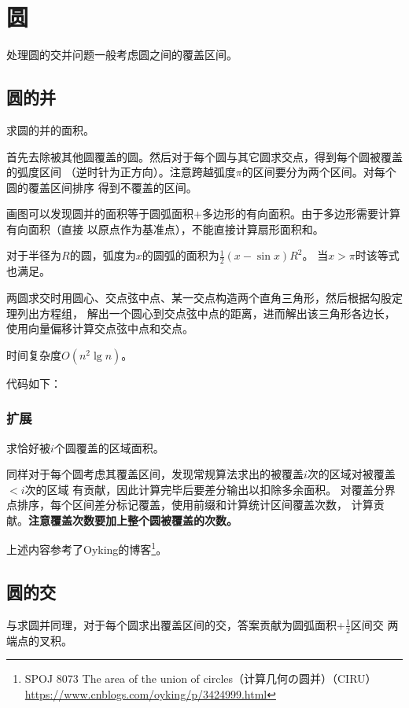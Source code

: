 \section{圆}
处理圆的交并问题一般考虑圆之间的覆盖区间。
\subsection{圆的并}
求圆的并的面积。

首先去除被其他圆覆盖的圆。然后对于每个圆与其它圆求交点，得到每个圆被覆盖的弧度区间
（逆时针为正方向）。注意跨越弧度$\pi$的区间要分为两个区间。对每个圆的覆盖区间排序
得到不覆盖的区间。

画图可以发现圆并的面积等于圆弧面积+多边形的有向面积。由于多边形需要计算有向面积（直接
以原点作为基准点），不能直接计算扇形面积和。

对于半径为$R$的圆，弧度为$x$的圆弧的面积为$\frac{1}{2}(x-\sin x)R^2$。
当$x> \pi$时该等式也满足。

两圆求交时用圆心、交点弦中点、某一交点构造两个直角三角形，然后根据勾股定理列出方程组，
解出一个圆心到交点弦中点的距离，进而解出该三角形各边长，使用向量偏移计算交点弦中点和交点。

时间复杂度$O(n^2 \lg n)$。

代码如下：


\subsubsection{扩展}
求恰好被$i$个圆覆盖的区域面积。

同样对于每个圆考虑其覆盖区间，发现常规算法求出的被覆盖$i$次的区域对被覆盖$<i$次的区域
有贡献，因此计算完毕后要差分输出以扣除多余面积。
对覆盖分界点排序，每个区间差分标记覆盖，使用前缀和计算统计区间覆盖次数，
计算贡献。{\bfseries 注意覆盖次数要加上整个圆被覆盖的次数。}



上述内容参考了Oyking的博客\footnote{
	SPOJ 8073 The area of the union of circles（计算几何の圆并）（CIRU）
	\url{https://www.cnblogs.com/oyking/p/3424999.html}
}。
\subsection{圆的交}
与求圆并同理，对于每个圆求出覆盖区间的交，答案贡献为圆弧面积+$\frac{1}{2}$区间交
两端点的叉积。
